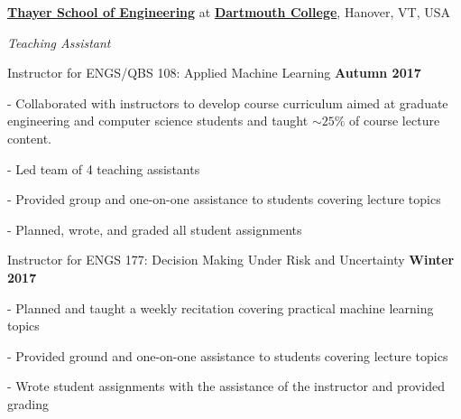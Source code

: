 \href{https://engineering.dartmouth.edu/}{\textbf{Thayer School of Engineering}}
at 
\href{https://dartmouth.edu}{\textbf{Dartmouth College}},
Hanover, VT, USA

\begin{innerlist}
\item[] \textit{Teaching Assistant}%
    \begin{innerlist}
        \item[] Instructor for ENGS/QBS 108: Applied Machine Learning
            \hfill \textbf{Autumn 2017}
        \begin{innerlist}
            \item[-] Collaborated with instructors to develop course curriculum aimed at graduate engineering and computer science students and taught $\sim 25\%$ of course lecture content.
            \item[-] Led team of 4 teaching assistants
            \item[-] Provided group and one-on-one assistance to students covering lecture topics
            \item[-] Planned, wrote, and graded all student assignments
        \end{innerlist}


        \item[] Instructor for ENGS 177: Decision Making Under Risk and Uncertainty
            \hfill \textbf{Winter 2017}
        \begin{innerlist}
            \item[-] Planned and taught a weekly recitation covering practical machine learning topics
            \item[-] Provided ground and one-on-one assistance to students covering lecture topics
            \item[-] Wrote student assignments with the assistance of the instructor and provided grading
        \end{innerlist}

    \end{innerlist}

\end{innerlist}


